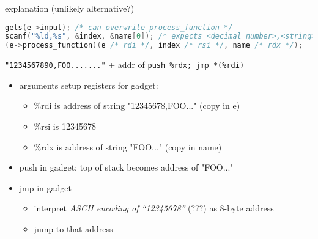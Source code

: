 \begin{soln}
\begin{frame}[fragile,label=useFPtrOverwrite2Explain]{explanation (unlikely alternative?)}
\begin{lstlisting}[language=C++,style=script]
gets(e->input); /* can overwrite process_function */
scanf("%ld,%s", &index, &name[0]); /* expects <decimal number>,<string> */
(e->process_function)(e /* rdi */, index /* rsi */, name /* rdx */);
\end{lstlisting}
\texttt{"1234567890,FOO......."} + addr of \texttt{push \%rdx; jmp *(\%rdi)}
\begin{itemize}
\item arguments setup registers for gadget:
\begin{itemize}
    \item \%rdi is address of string "12345678,FOO..." (copy in e)
    \item \%rsi is 12345678
    \item \%rdx is address of string "FOO..." (copy in name)
\end{itemize}
\item push in gadget: top of stack becomes address of "FOO..."
\item jmp in gadget
    \begin{itemize}
    \item interpret \textit{ASCII encoding of ``12345678''} (???) as 8-byte address
    \item jump to that address
    \end{itemize}
\end{itemize}
\end{frame}
\end{soln}
